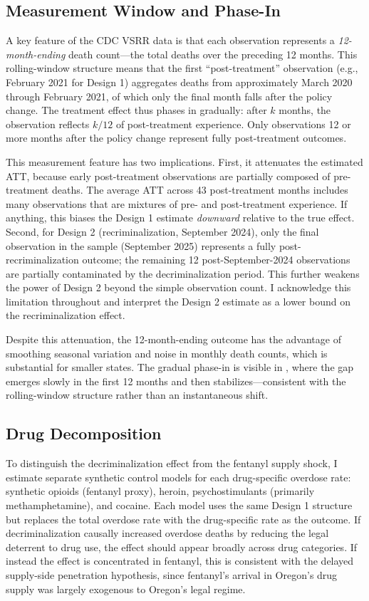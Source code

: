 \documentclass[12pt]{article}
\begin{document}
\subsection{Measurement Window and Phase-In}

A key feature of the CDC VSRR data is that each observation represents a \textit{12-month-ending} death count---the total deaths over the preceding 12 months. This rolling-window structure means that the first ``post-treatment'' observation (e.g., February 2021 for Design 1) aggregates deaths from approximately March 2020 through February 2021, of which only the final month falls after the policy change. The treatment effect thus phases in gradually: after $k$ months, the observation reflects $k/12$ of post-treatment experience. Only observations 12 or more months after the policy change represent fully post-treatment outcomes.

This measurement feature has two implications. First, it attenuates the estimated ATT, because early post-treatment observations are partially composed of pre-treatment deaths. The average ATT across 43 post-treatment months includes many observations that are mixtures of pre- and post-treatment experience. If anything, this biases the Design 1 estimate \textit{downward} relative to the true effect. Second, for Design 2 (recriminalization, September 2024), only the final observation in the sample (September 2025) represents a fully post-recriminalization outcome; the remaining 12 post-September-2024 observations are partially contaminated by the decriminalization period. This further weakens the power of Design 2 beyond the simple observation count. I acknowledge this limitation throughout and interpret the Design 2 estimate as a lower bound on the recriminalization effect.

Despite this attenuation, the 12-month-ending outcome has the advantage of smoothing seasonal variation and noise in monthly death counts, which is substantial for smaller states. The gradual phase-in is visible in , where the gap emerges slowly in the first 12 months and then stabilizes---consistent with the rolling-window structure rather than an instantaneous shift.

\subsection{Drug Decomposition}

To distinguish the decriminalization effect from the fentanyl supply shock, I estimate separate synthetic control models for each drug-specific overdose rate: synthetic opioids (fentanyl proxy), heroin, psychostimulants (primarily methamphetamine), and cocaine. Each model uses the same Design 1 structure but replaces the total overdose rate with the drug-specific rate as the outcome. If decriminalization causally increased overdose deaths by reducing the legal deterrent to drug use, the effect should appear broadly across drug categories. If instead the effect is concentrated in fentanyl, this is consistent with the delayed supply-side penetration hypothesis, since fentanyl's arrival in Oregon's drug supply was largely exogenous to Oregon's legal regime.
\end{document}
